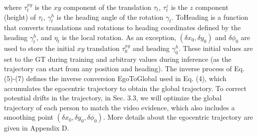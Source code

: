 where $\tau^{xy}_t$ is the $xy$ component of the translation $\tau_t$, $\tau^z_t$ is the $z$ component (height) of $\tau_t$, $\gamma^h_t$ is the heading angle of the rotation $\gamma_t$. ToHeading is a function that converts translations and rotations to heading coordinates defined by the heading $\gamma^h_t$, and $\eta_t$ is the local rotation. As an exception, $(\delta x_0, \delta y_0)$ and $\delta\phi_0$ are used to store the initial $xy$ translation $\tau^{xy}_0$ and heading $\gamma^h_0$. These initial values are set to the GT during training and arbitrary values during inference (as the trajectory can start from any position and heading). The inverse process of Eq. (5)-(7) defines the inverse conversion EgoToGlobal used in Eq. (4), which accumulates the egocentric trajectory to obtain the global trajectory. To correct potential drifts in the trajectory, in Sec. 3.3, we will optimize the global trajectory of each person to match the video evidence, which also includes a smoothing point $(\delta x_0, \delta y_0, \delta\phi_0)$. More details about the egocentric trajectory are given in Appendix D.

